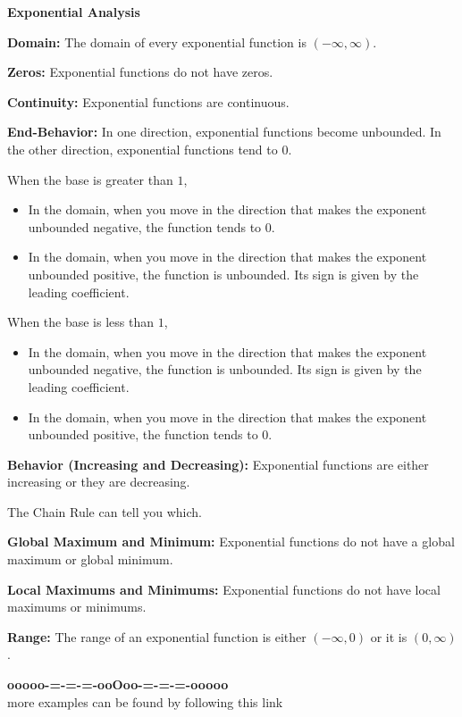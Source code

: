 \documentclass{ximera}
\begin{document}
\begin{summary}\textbf{\textcolor{red!70!yellow}{Exponential Analysis}}


\textbf{Domain:} The domain of every exponential function is $(-\infty, \infty)$.

\textbf{Zeros:} Exponential functions do not have zeros.

\textbf{Continuity:} Exponential functions are continuous.

\textbf{End-Behavior:} In one direction, exponential functions become unbounded. In the other direction, exponential functions tend to $0$.


When the base is greater than $1$,
\begin{itemize}
\item In the domain, when you move in the direction that makes the exponent unbounded negative, the function tends to $0$.
\item In the domain, when you move in the direction that makes the exponent unbounded positive, the function is unbounded. Its sign is given by the leading coefficient.
\end{itemize}




When the base is less than $1$,
\begin{itemize}
\item In the domain, when you move in the direction that makes the exponent unbounded negative, the function is unbounded. Its sign is given by the leading coefficient.
\item In the domain, when you move in the direction that makes the exponent unbounded positive, the function tends to $0$.
\end{itemize}




\textbf{Behavior (Increasing and Decreasing):} Exponential functions are either increasing or they are decreasing.

The Chain Rule can tell you which.

\textbf{Global Maximum and Minimum:}  Exponential functions do not have a global maximum or global minimum.

\textbf{Local Maximums and Minimums:} Exponential functions do not have local maximums or minimums.

\textbf{Range:} The range of an exponential function is either $(-\infty, 0)$ or it is $(0, \infty)$.



\end{summary}










\begin{center}
\textbf{\textcolor{green!50!black}{ooooo-=-=-=-ooOoo-=-=-=-ooooo}} \\

more examples can be found by following this link\\ 

\end{center}
\end{document}
